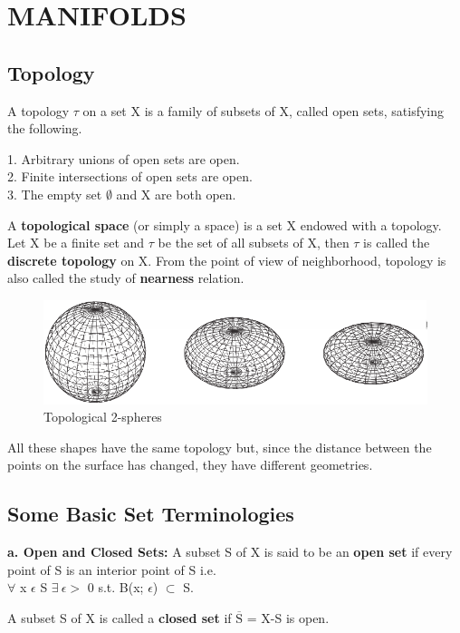 \section{MANIFOLDS}
\subsection{Topology}
A topology $\tau$ on a set X is a family of subsets of X, called
open sets, satisfying the following.

1. Arbitrary unions of open sets are open. \\
2. Finite intersections of open sets are open. \\
3. The empty set $\emptyset$ and X are both open.

A \textbf{topological space} (or simply a space) is a set X endowed with a topology.
Let X be a finite set and $\tau$ be the set of all subsets of X, then $\tau$ is called the \textbf{discrete topology} on X.
From the point of view of neighborhood, topology is also called the study of \textbf{nearness} relation.
\begin{figure}[h]
    \begin{center}
        \includegraphics[width=\textwidth]{figures/topology_sphere.png}
        \caption{Topological 2-spheres}
    \end{center}
\end{figure}

All these shapes have the same topology but, since
the distance between the points on the surface has changed, they have different
geometries.

\subsection{Some Basic Set Terminologies}
\textbf{a. Open and Closed Sets:} A subset S of X is said to be an \textbf{open set} if every point of S is an interior point of S i.e. \\
$\forall$ x $\epsilon$ S $\exists \: \epsilon >$ 0 s.t. B(x; $\epsilon$) $\subset$ S.

A subset S of X is called a \textbf{closed set} if $\overline{\text{S}}$ = X-S is open.

